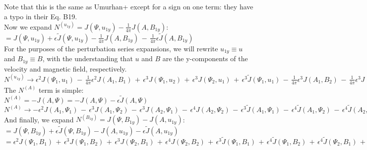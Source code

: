 \documentclass[letterpaper,12pt]{article}
\begin{document}
Note that this is the same as Umurhan+ except for a sign on one term: they have a typo in their Eq. B19. \\

Now we expand $N^{(u_{1y})} = J(\Psi, u_{1y}) - \frac{1}{4\pi} J(A, B_{1y})$: \\

$= J(\Psi, u_{1y}) + \epsilon \widetilde{J}(\Psi, u_{1y}) - \frac{1}{4\pi}J(A, B_{1y}) \, - \, \frac{1}{4\pi}\epsilon \widetilde{J}(A, B_{1y})$ \\

For the purposes of the perturbation series expansions, we will rewrite $u_{1y} \equiv u$ and $B_{1y} \equiv B$, with the understanding that $u$ and $B$ are the y-components of the velocity and magnetic field, respectively. \\

$N^{(u_{1y})} \to \epsilon^2 J(\Psi_1, u_1) \, - \, \frac{1}{4\pi} \epsilon^2 J(A_1, B_1) \, + \, \epsilon^3 J(\Psi_1, u_2) \, + \, \epsilon^3 J(\Psi_2, u_1) \, + \, \epsilon^3 \widetilde{J}(\Psi_1, u_1) \, - \, \frac{1}{4\pi} \epsilon^3 J(A_1, B_2) \, - \, \frac{1}{4\pi} \epsilon^3 J(A_2, B_1) \, - \, \frac{1}{4\pi}\epsilon^3 \widetilde{J}(A_1, B_1) \, + \, \mathcal{O}(\epsilon^4)$ \\

The $N^{(A)}$ term is simple: \\

$N^{(A)} = -J(A, \Psi) = -J(A, \Psi) - \epsilon\widetilde{J}(A, \Psi)$ \\

$N^{(A)} \to -\epsilon^2 J(A_1, \Psi_1) \, - \, \epsilon^3 J(A_1, \Psi_2) \, - \, \epsilon^3 J(A_2, \Psi_1) \, - \, \epsilon^4 J(A_2, \Psi_2) \, - \, \epsilon^3 \widetilde{J}(A_1, \Psi_1) \, - \, \epsilon^4 \widetilde{J}(A_1, \Psi_2) \, - \, \epsilon^4 \widetilde{J}(A_2, \Psi_1) \, - \, \epsilon^5 \widetilde{J}(A_2, \Psi_2)$ \\

And finally, we expand $N^{(B_{1y})} = J(\Psi, B_{1y}) - J(A, u_{1y})$: \\

$= J(\Psi, B_{1y}) + \epsilon\widetilde{J}(\Psi, B_{1y}) - J(A, u_{1y}) - \epsilon\widetilde{J}(A, u_{1y})$ \\

$ = \epsilon^2 J(\Psi_1, B_1) \, + \, \epsilon^3 J(\Psi_1, B_2) \, + \, \epsilon^3 J(\Psi_2, B_1) \, + \, \epsilon^4 J(\Psi_2, B_2) \, + \, \epsilon^3\widetilde{J}(\Psi_1, B_1) \, + \, \epsilon^4\widetilde{J}(\Psi_1, B_2) \, + \, \epsilon^4 \widetilde{J}(\Psi_2, B_1) \, + \, \epsilon^5 \widetilde{J}(\Psi_2, B_2) \, - \, \epsilon^2 J(A_1, u_1) \, - \, \epsilon^3 J(A_1, u_2) \, - \, \epsilon^3 J(A_2, u_1) \, - \, \epsilon^4 J(A_2, u_2) \, - \, \epsilon^3 \widetilde{J}(A_1, u_1) \, - \, \epsilon^4 \widetilde{J}(A_1, u_2) \, - \, \epsilon^4 \widetilde{J}(\Psi_2, B_1) \, - \, \epsilon^5 \widetilde{J}(\Psi_2, B_2)$\\
\end{document}
